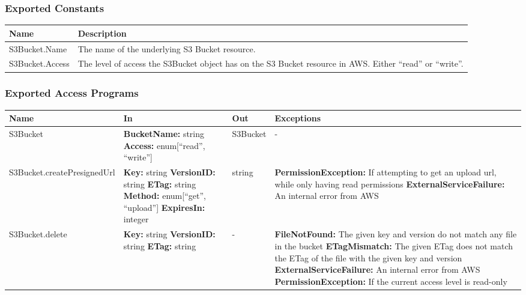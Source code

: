 \documentclass[12pt, titlepage]{article}
\begin{document}
{  \subsubsection{Exported Constants}

  \begin{center}
    \begin{tabular}{p{4cm} p{12cm}}
      \hline
      \textbf{Name} & \textbf{Description} \\
      \hline
      S3Bucket.Name & The name of the underlying S3 Bucket resource. \\
      \hline
      S3Bucket.Access & The level of access the S3Bucket object has on
      the S3 Bucket resource in AWS. Either ``read'' or ``write''. \\
      \hline
    \end{tabular}
  \end{center}

  \subsubsection{Exported Access Programs}

  \begin{center}
    \begin{tabular}{>{\raggedright}p{5cm} >{\raggedright}p{4cm}
      >{\raggedright}p{2cm} p{4cm}}
      \hline
      \textbf{Name} & \textbf{In} & \textbf{Out} & \textbf{Exceptions} \\
      \hline
      S3Bucket & \textbf{BucketName:} string \newline \textbf{Access:}
      enum[``read'', ``write''] & S3Bucket & - \\
      \hline
      S3Bucket.createPresignedUrl & \textbf{Key:} string \newline
      \textbf{VersionID:} string \newline \textbf{ETag:} string
      \newline \textbf{Method:} enum[``get'', ``upload''] \newline
      \textbf{ExpiresIn:} integer & string &
      \textbf{PermissionException:} If attempting to get an upload url,
      while only having read permissions \newline
      \textbf{ExternalServiceFailure:} An internal error from AWS \\
      \hline
      S3Bucket.delete & \textbf{Key:} string \newline
      \textbf{VersionID:} string \newline \textbf{ETag:} string & - &
      \textbf{FileNotFound:} The given key and version do not match any
      file in the bucket \newline \textbf{ETagMismatch:} The given ETag
      does not match the ETag of the file with the given key and
      version \newline \textbf{ExternalServiceFailure:} An internal
      error from AWS \newline \textbf{PermissionException:} If the
      current access level is read-only \\
      \hline
    \end{tabular}
  \end{center}

}
\end{document}
